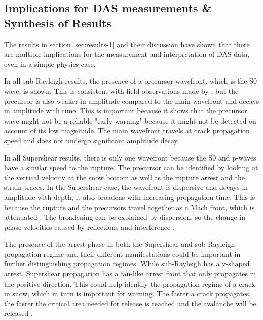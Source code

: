 \subsection{Implications for DAS measurements \& Synthesis of Results}

The results in section \ref{sec:results-1} and their discussion have shown that there are multiple implications for the measurement and interpretation of DAS data, even in a simple physics case. \par 

In all sub-Rayleigh results, the presence of a precursor wavefront, which is the S0 wave, is shown. This is consistent with field observations made by \cite{herwijnenSeismicSensorArray2011}, but the precursor is also weaker in amplitude compared to the main wavefront and decays in amplitude with time. This is important because it shows that the precursor wave might not be a reliable "early warning" because it might not be detected on account of its low magnitude. The main wavefront travels at crack propagation speed and does not undergo significant amplitude decay. \par

In all Supershear results, there is only one wavefront because the S0 and p-waves have a similar speed to the rupture. The precursor can be identified by looking at the vertical velocity at the snow bottom as well as the rupture arrest and the strain traces. In the Supershear case, the wavefront is dispersive and decays in amplitude with depth, it also broadens with increasing propagation time. This is because the rupture and the precursors travel together as a Mach front, which is attenuated \parencite{dunhamNearsourceGroundMotion2005}. The broadening can be explained by dispersion, so the change in phase velocities caused by reflections and interference \parencite{graffWaveMotionElastic1975}. \par

The presence of the arrest phase in both the Supershear and sub-Rayleigh propagation regime and their different manifestations could be important in further distinguishing propagation regimes. While sub-Rayleigh has a v-shaped arrest, Supershear propagation has a fan-like arrest front that only propagates in the positive direction. This could help identify the propagation regime of a crack in snow, which in turn is important for warning. The faster a crack propagates, the faster the critical area needed for release is reached and the avalanche will be released \parencite{bergfeldSignaturesSubRayleighSupershear2025,trottetTransitionSubRayleighAnticrack2022}. \par

